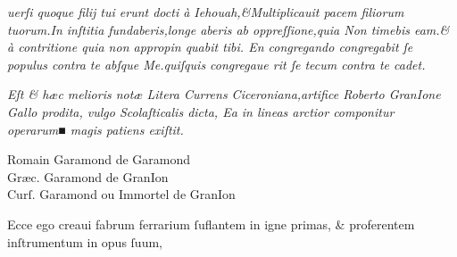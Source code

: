 \documentclass{article}
\newcommand{\threecolumntypefacenames}[3]{\begin{multicols}{3}
		\tiny
		\hfill \qquad \qquad \qquad \qquad #1\hspace*{\fill}\\
		\columnbreak
		\hfill #2\hspace*{\fill}\\
		\columnbreak
		\hfill #3\qquad \qquad \qquad \qquad \hspace*{\fill}
\end{multicols}}
\begin{document}
{\begin{multicols}{2}
	\columnbreak
	\justifying
	\noindent
	\textit{uerſi quoque filij tui erunt docti \`a Iehouah,\&Multiplicauit pacem filiorum tuorum.In inſtitia\linebreak
	fundaberis,longe aberis ab oppreſſione,quia Non timebis eam.\& \`a contritione quia non appropin\linebreak
	quabit tibi. {E}n congregando congregabit ſe populus contra te abſque {M}e.quiſquis congregaue\linebreak
	rit ſe tecum contra te cadet.}
\end{multicols}
\vspace{-1\baselineskip}
\noindent{}  \normalsize {\large \scalebox{0.7}{☞}} \fontsize{6}{7}\selectfont\textit{Eſt \& h\ae{}c melioris not\ae{} Litera Currens Ciceroniana,artifice Roberto GranIone Gallo prodita, vulgo Scolaſticalis dicta, Ea in lineas arctior componitur operarum■ magis patiens exiſtit.}
\vspace{-1.5\baselineskip}
\threecolumntypefacenames{Romain Garamond de Garamond}{Gr\ae{}c. Garamond de GranIon}{Curſ. Garamond ou Immortel de GranIon}
\vspace{-3\baselineskip}
\begin{multicols}{2}
	\fontsize{6.25}{7}\selectfont
	\justifying
	\noindent \quad Ecce ego creaui fabrum ferrarium ſuflantem in igne primas, \& proferentem inſtrumentum in opus ſuum,\linebreak


\end{multicols}}
\end{document}
